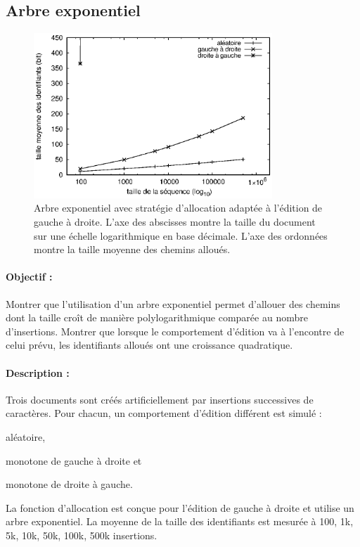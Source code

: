 \subsection{Arbre exponentiel}

\begin{figure}
  \begin{center}
    \includegraphics[width=0.8\textwidth]{img/lseq/double.eps}
    \caption[Influence de l'arbre exponentiel sur la taille des chemins]
    {\label{repl:img:exponentialtree} Arbre exponentiel avec stratégie
      d'allocation adaptée à l'édition de gauche à droite. L'axe des abscisses
      montre la taille du document sur une échelle logarithmique en base
      décimale. L'axe des ordonnées montre la taille moyenne des chemins
      alloués.}
  \end{center}
\end{figure}

\paragraph{Objectif :} Montrer que l'utilisation d'un arbre exponentiel permet
d'allouer des chemins dont la taille croît de manière polylogarithmique comparée
au nombre d'insertions. Montrer que lorsque le comportement d'édition va à
l'encontre de celui prévu, les identifiants alloués ont une croissance
quadratique.

\paragraph{Description :} Trois documents sont créés artificiellement par
insertions successives de caractères. Pour chacun, un comportement d'édition
différent est simulé :
\begin{inparaenum}[(i)]
\item aléatoire,
\item monotone de gauche à droite et
\item monotone de droite à gauche.
\end{inparaenum}
La fonction d'allocation est conçue pour l'édition de gauche à droite et utilise
un arbre exponentiel.  La moyenne de la taille des identifiants est mesurée à
100, 1k, 5k, 10k, 50k, 100k, 500k insertions. 

